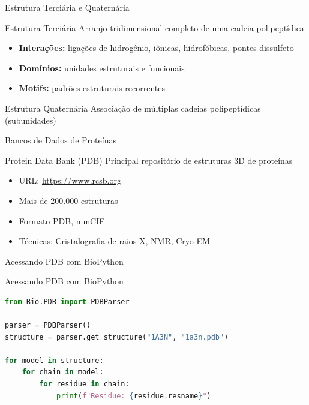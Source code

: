 \begin{frame}[allowframebreaks]{Estrutura Terciária e Quaternária}
\begin{block}{Estrutura Terciária}
Arranjo tridimensional completo de uma cadeia polipeptídica
\begin{itemize}
    \item \textbf{Interações:} ligações de hidrogênio, iônicas, hidrofóbicas, pontes dissulfeto
    \item \textbf{Domínios:} unidades estruturais e funcionais
    \item \textbf{Motifs:} padrões estruturais recorrentes
\end{itemize}
\end{block}

\vspace{0.3cm}

\begin{block}{Estrutura Quaternária}
Associação de múltiplas cadeias polipeptídicas (subunidades)
\end{block}

\end{frame}

\begin{frame}[fragile]{Bancos de Dados de Proteínas}
\begin{block}{Protein Data Bank (PDB)}
Principal repositório de estruturas 3D de proteínas
\begin{itemize}
    \item URL: \url{https://www.rcsb.org}
    \item Mais de 200.000 estruturas
    \item Formato PDB, mmCIF
    \item Técnicas: Cristalografia de raios-X, NMR, Cryo-EM
\end{itemize}
\end{block}
\end{frame}

\begin{frame}[fragile]{Acessando PDB com BioPython}

\begin{exampleblock}{Acessando PDB com BioPython}
\begin{lstlisting}[language=Python]
from Bio.PDB import PDBParser

parser = PDBParser()
structure = parser.get_structure("1A3N", "1a3n.pdb")

for model in structure:
    for chain in model:
        for residue in chain:
            print(f"Residue: {residue.resname}")
\end{lstlisting}
\end{exampleblock}
\end{frame}

